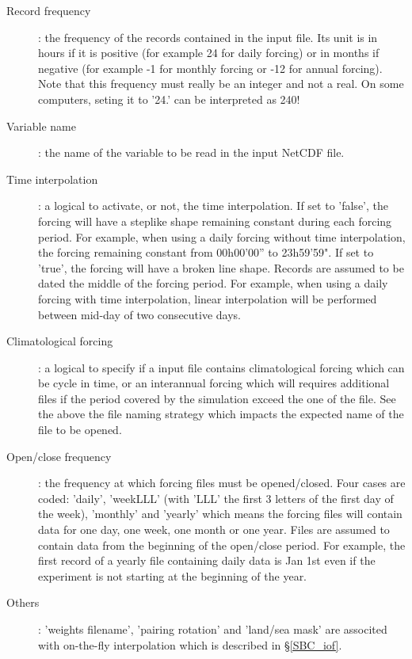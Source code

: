 \documentclass[NEMO_book]{subfiles}
\begin{document}
\begin{description}
\item[Record frequency]: the frequency of the records contained in the input file. 
Its unit is in hours if it is positive (for example 24 for daily forcing) or in months if negative 
(for example -1 for monthly forcing or -12 for annual forcing). 
Note that this frequency must really be an integer and not a real. 
On some computers, seting it to '24.' can be interpreted as 240!

\item[Variable name]: the name of the variable to be read in the input NetCDF file.

\item[Time interpolation]: a logical to activate, or not, the time interpolation. If set to 'false', 
the forcing will have a steplike shape remaining constant during each forcing period. 
For example, when using a daily forcing without time interpolation, the forcing remaining 
constant from 00h00'00'' to 23h59'59". If set to 'true', the forcing will have a broken line shape. 
Records are assumed to be dated the middle of the forcing period. 
For example, when using a daily forcing with time interpolation, linear interpolation will 
be performed between mid-day of two consecutive days. 

\item[Climatological forcing]: a logical to specify if a input file contains climatological forcing 
which can be cycle in time, or an interannual forcing which will requires additional files 
if the period covered by the simulation exceed the one of the file. See the above the file 
naming strategy which impacts the expected name of the file to be opened. 

\item[Open/close frequency]: the frequency at which forcing files must be opened/closed. 
Four cases are coded: 'daily', 'weekLLL' (with 'LLL' the first 3 letters of the first day of the week), 
'monthly' and 'yearly' which means the forcing files will contain data for one day, one week, 
one month or one year. Files are assumed to contain data from the beginning of the open/close period. 
For example, the first record of a yearly file containing daily data is Jan 1st even if the experiment 
is not starting at the beginning of the year. 

\item[Others]: 'weights filename', 'pairing rotation' and 'land/sea mask' are associted with on-the-fly interpolation 
which is described in \S\ref{SBC_iof}.

\end{description}
\end{document}
